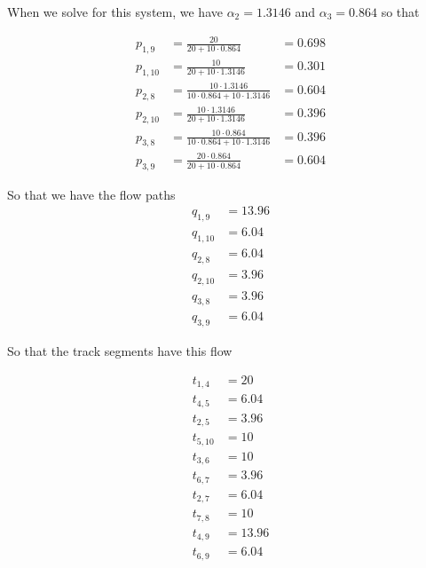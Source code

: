 \documentclass{article}
\begin{document}
When we solve for this system, we have 
$\alpha_2=1.3146$ and $\alpha_3=0.864$ so that 

\begin{align}
p_{1,9} &= \frac{20}{20 + 10\cdot 0.864} &= 0.698\\
p_{1,10} &= \frac{10}{20 + 10\cdot 1.3146} &= 0.301\\
p_{2,8} &= \frac{10\cdot 1.3146}{10\cdot 0.864 + 10\cdot 1.3146} &= 0.604\\
p_{2,10} &= \frac{10\cdot 1.3146}{20 + 10\cdot 1.3146} &= 0.396 \\
p_{3,8} &= \frac{10\cdot 0.864}{10\cdot 0.864 + 10\cdot 1.3146} &= 0.396 \\
p_{3,9} &= \frac{20\cdot 0.864}{20 + 10\cdot 0.864} &= 0.604 
\end{align}

So that we have the flow paths
\begin{align}
q_{1,9} &= 13.96 \\
q_{1,10} &= 6.04 \\
q_{2,8} &= 6.04 \\
q_{2,10} &= 3.96 \\
q_{3,8} & = 3.96 \\
q_{3,9} & = 6.04
\end{align}

So that the track segments have this flow

\begin{align}
t_{1,4} &= 20 \\
t_{4,5} &= 6.04 \\
t_{2,5} &= 3.96 \\
t_{5,10} &= 10 \\
t_{3,6} &= 10 \\
t_{6,7} &= 3.96 \\
t_{2,7} &= 6.04 \\
t_{7,8} &= 10 \\
t_{4,9} &= 13.96 \\
t_{6,9} &= 6.04
\end{align}
\end{document}

